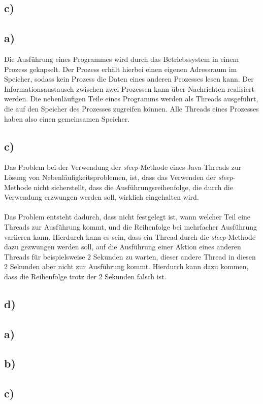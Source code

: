 \documentclass[ngerman]{fbi-aufgabenblatt}
\begin{document}
\setcounter{section}{1}

\subsection*{c)}



\subsection*{a)}
Die Ausführung eines Programmes wird durch das Betriebssystem in einem Prozess gekapselt. Der Prozess erhält hierbei einen eigenen Adressraum im Speicher, sodass kein Prozess die Daten eines anderen Prozesses lesen kann. Der Informationsaustausch zwischen zwei Prozessen kann über Nachrichten realisiert werden. Die nebenläufigen Teile eines Programms werden als Threads ausgeführt, die auf den Speicher des Prozesses zugreifen können. Alle Threads eines Prozesses haben also einen gemeinsamen Speicher.

\subsection*{c)}
Das Problem bei der Verwendung der \textit{sleep}-Methode eines Java-Threads zur Lösung von Nebenläufigkeitsproblemen, ist, dass das Verwenden der \textit{sleep}-Methode nicht sicherstellt, dass die Ausführungsreihenfolge, die durch die Verwendung erzwungen werden soll, wirklich eingehalten wird. \\
\\
Das Problem entsteht dadurch, dass nicht festgelegt ist, wann welcher Teil eine Threads zur Ausführung kommt, und die Reihenfolge bei mehrfacher Ausführung variieren kann. Hierdurch kann es sein, dass ein Thread durch die \textit{sleep}-Methode dazu gezwungen werden soll, auf die Ausführung einer Aktion eines anderen Threads für beispielsweise $2$ Sekunden zu warten, dieser andere Thread in diesen $2$ Sekunden aber nicht zur Ausführung kommt. Hierdurch kann dazu kommen, dass die Reihenfolge trotz der $2$ Sekunden falsch ist.
\subsection*{d)}


\subsection*{a)}
\subsection*{b)}
\subsection*{c)}
\end{document}
